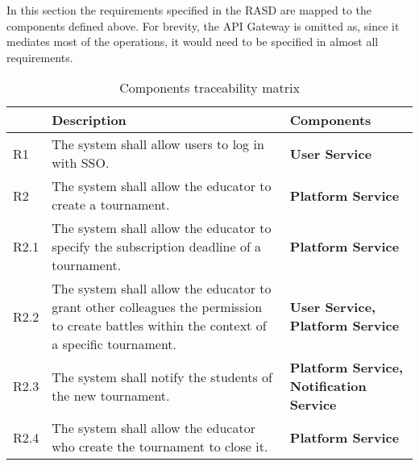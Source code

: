 In this section the requirements specified in the RASD are mapped to the components defined above. For brevity,
the API Gateway is omitted as, since it mediates most of the operations, it would need to be specified in almost
all requirements.
\begin{center}
    \begin{longtable}{|l|p{8cm}|p{5cm}|}
        \hline
              & \textbf{Description}                                                                                                                                                           & \textbf{Components}                                                        \\\hline
        \hline
        \endhead
        \hline
        \endfoot
        \hline
        \caption{Components traceability matrix}
        \label{table:Components traceability matrix}
        \endlastfoot
        R1    & The system shall allow users to log in with SSO.                                                                                                                               & \textbf{User Service}                                                      \\\hline
        R2    & The system shall allow the educator to create a tournament.                                                                                                                    & \textbf{Platform Service}                                                  \\\hline
        R2.1  & The system shall allow the educator to specify the subscription deadline of a tournament.                                                                                      & \textbf{Platform Service}                                                  \\\hline
        R2.2  & The system shall allow the educator to grant other colleagues the permission to create battles within the context of a specific tournament.                                    & \textbf{User Service, Platform Service}                                    \\\hline
        R2.3  & The system shall notify the students of the new tournament.                                                                                                                    & \textbf{Platform Service, Notification Service}                            \\\hline
        R2.4  & The system shall allow the educator who create the tournament to close it.                                                                                                     & \textbf{Platform Service}                                                  \\\hline

\end{longtable}
\end{center}

